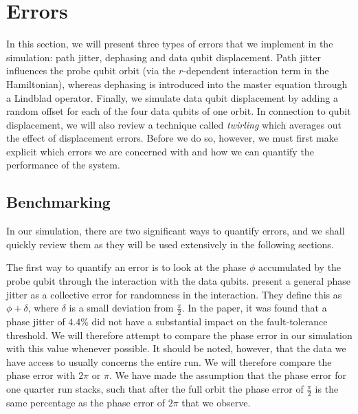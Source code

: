 \section{Errors} \label{sec:errors}
In this section, we will present three types of errors that we implement in the simulation: path jitter, dephasing and data qubit displacement. Path jitter influences the probe qubit orbit (via the $r$-dependent interaction term in the Hamiltonian), whereas dephasing is introduced into the master equation through a Lindblad operator. Finally, we simulate data qubit displacement by adding a random offset for each of the four data qubits of one orbit. In connection to qubit displacement, we will also review a technique called \emph{twirling} which averages out the effect of displacement errors. Before we do so, however, we must first make explicit which errors we are concerned with and how we can quantify the performance of the system. 

\subsection{Benchmarking}
In our simulation, there are two significant ways to quantify errors, and we shall quickly review them as they will be used extensively in the following sections.

The first way to quantify an error is to look at the phase $\phi$ accumulated by the probe qubit through the interaction with the data qubits. \citet{OGorman2016} present a general phase jitter as a collective error for randomness in the interaction. They define this as $\phi + \delta$, where $\delta$ is a small deviation from $\frac{\pi}{2}$.  In the paper, it was found that a phase jitter of $4.4 \%$ did not have a substantial impact on the fault-tolerance threshold. We will therefore attempt to compare the phase error in our simulation with this value whenever possible. It should be noted, however, that the data we have access to usually concerns the entire run. We will therefore compare the phase error with $2\pi$ or $\pi$. We have made the assumption that the phase error for one quarter run stacks, such that after the full orbit the phase error of $\frac{\pi}{2}$ is the same percentage as the phase error of $2\pi$ that we observe. 

